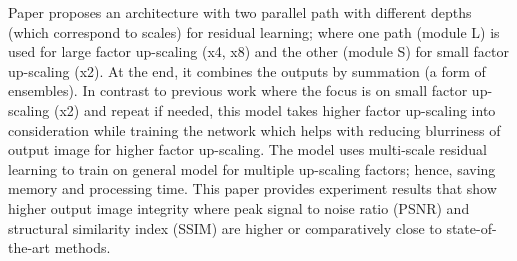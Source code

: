\documentclass[11pt]{article}
\begin{document}
  Paper proposes an architecture with two parallel path with different depths (which correspond to scales) for residual learning; where one path (module L) is used for large factor up-scaling (x4, x8) and the other (module S) for small factor up-scaling (x2). At the end, it combines the outputs by summation (a form of ensembles). In contrast to previous work where the focus is on small factor up-scaling (x2) and repeat if needed, this model takes higher factor up-scaling into consideration while training the network which helps with reducing blurriness of output image for higher factor up-scaling. The model uses multi-scale residual learning to train on general model for multiple up-scaling factors; hence, saving memory and processing time. This paper provides experiment results that show higher output image integrity where peak signal to noise ratio (PSNR) and structural similarity index (SSIM) are higher or comparatively close to state-of-the-art methods.  
\end{document}
